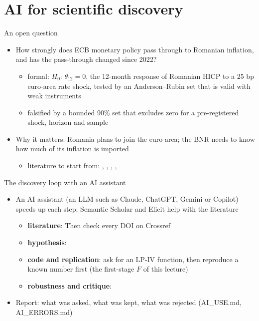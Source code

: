 \section{AI for scientific discovery}

\begin{frame}{An open question}
\itemsize{\small}
\begin{itemize}
    \item How strongly does ECB monetary policy pass through to Romanian inflation, and has the pass-through changed since 2022?
    \begin{itemize}
        \item formal: $H_0$: $\theta_{12} = 0$, the 12-month response of Romanian HICP to a 25 bp euro-area rate shock, tested by an Anderson--Rubin set that is valid with weak instruments
        \item falsified by a bounded 90\% set that excludes zero for a pre-registered shock, horizon and sample
    \end{itemize}
    \item Why it matters: Romania plans to join the euro area; the BNR needs to know how much of its inflation is imported
    \begin{itemize}
        \item literature to start from: , , , , 
    \end{itemize}
\end{itemize}
\end{frame}

\begin{frame}{The discovery loop with an AI assistant}
\itemsize{\footnotesize}
\begin{itemize}
    \item An AI assistant (an LLM such as Claude, ChatGPT, Gemini or Copilot) speeds up each step; Semantic Scholar and Elicit help with the literature
    \begin{itemize}
        \item \textbf{literature}:  Then check every DOI on Crossref
        \item \textbf{hypothesis}: 
        \item \textbf{code and replication}: ask for an LP-IV function, then reproduce a known number first (the first-stage $F$ of this lecture)
        \item \textbf{robustness and critique}: 
    \end{itemize}
    \item Report: what was asked, what was kept, what was rejected (AI\_USE.md, AI\_ERRORS.md)
\end{itemize}
\end{frame}

